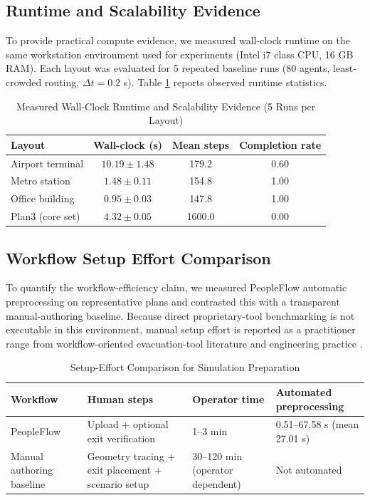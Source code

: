 \documentclass[journal]{IEEEtran}
\begin{document}
\subsection{Runtime and Scalability Evidence}
To provide practical compute evidence, we measured wall-clock runtime on the same workstation environment used for experiments (Intel i7 class CPU, 16 GB RAM). Each layout was evaluated for 5 repeated baseline runs (80 agents, least-crowded routing, $\Delta t=0.2$ s). Table \ref{tab:runtime_scalability} reports observed runtime statistics.

\begin{table}[t]
\centering
\caption{Measured Wall-Clock Runtime and Scalability Evidence (5 Runs per Layout)}
\label{tab:runtime_scalability}
{\footnotesize
\setlength{\tabcolsep}{3pt}
\begin{tabular}{>{\raggedright\arraybackslash}p{2.1cm}ccc}
\toprule
\textbf{Layout} & \textbf{Wall-clock (s)} & \textbf{Mean steps} & \textbf{Completion rate} \\
\midrule
Airport terminal & $10.19 \pm 1.48$ & 179.2 & 0.60 \\
Metro station & $1.48 \pm 0.11$ & 154.8 & 1.00 \\
Office building & $0.95 \pm 0.03$ & 147.8 & 1.00 \\
Plan3 (core set) & $4.32 \pm 0.05$ & 1600.0 & 0.00 \\
\bottomrule
\end{tabular}
}
\end{table}

\subsection{Workflow Setup Effort Comparison}
To quantify the workflow-efficiency claim, we measured PeopleFlow automatic preprocessing on representative plans and contrasted this with a transparent manual-authoring baseline. Because direct proprietary-tool benchmarking is not executable in this environment, manual setup effort is reported as a practitioner range from workflow-oriented evacuation-tool literature and engineering practice \cite{path_planning,ronchi2015}.

\begin{table}[t]
\centering
\caption{Setup-Effort Comparison for Simulation Preparation}
\label{tab:setup_effort}
{\footnotesize
\setlength{\tabcolsep}{3pt}
\begin{tabular}{>{\raggedright\arraybackslash}p{2.15cm} p{1.2cm} p{1.55cm} p{1.55cm}}
\toprule
\textbf{Workflow} & \textbf{Human steps} & \textbf{Operator time} & \textbf{Automated preprocessing} \\
\midrule
PeopleFlow & Upload + optional exit verification & 1--3 min & 0.51--67.58 s (mean 27.01 s) \\
Manual authoring baseline & Geometry tracing + exit placement + scenario setup & 30--120 min (operator dependent) & Not automated \\
\bottomrule
\end{tabular}
}
\end{table}
\end{document}
